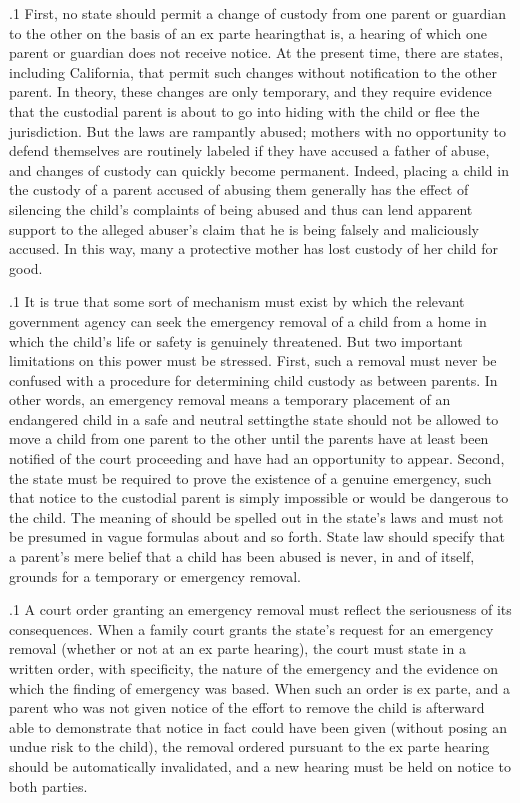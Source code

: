 \documentclass[11pt, twoside]{article}
\begin{document}
{\p.1{%
First, no state should permit a change of custody from one parent or
guardian to the other on the basis of an ex parte hearing\mdash{}that is, a hearing
of which one parent or guardian does not receive notice. At the present
time, there are states, including California, that permit such changes
without notification to the other parent. In theory, these changes are
only temporary, and they require evidence that the custodial parent
is about to go into hiding with the child or flee the jurisdiction. But
the laws are rampantly abused; mothers with no opportunity to defend
themselves are routinely labeled  if they have accused a father of abuse, and  changes of custody can quickly become
permanent. Indeed, placing a child in the custody of a parent accused
of abusing them generally has the effect of silencing the child’s complaints of being abused and thus can lend apparent support to the alleged
abuser’s claim that he is being falsely and maliciously accused. In this
way, many a protective mother has lost custody of her child for good.
}%

\p.1{%
It is true that some sort of mechanism must exist by which the relevant government agency can seek the emergency removal of a child from
a home in which the child’s life or safety is genuinely threatened. But
two important limitations on this power must be stressed. First, such
a removal must never be confused with a procedure for determining
child custody as between parents. In other words, an emergency removal
means a temporary placement of an endangered child in a safe and neutral setting\mdash{}the state should not be allowed to move a child from one
parent to the other until the parents have at least been notified of the
court proceeding and have had an opportunity to appear. Second, the
state must be required to prove the existence of a genuine emergency,
such that notice to the custodial parent is simply impossible or would be
dangerous to the child. The meaning of  should be spelled
out in the state’s laws and must not be presumed in vague formulas about
 and so forth. State law should specify that a parent’s mere belief that a child has been abused is never, in and of itself,
grounds for a temporary or emergency removal.
}%

\p.1{%
A court order granting an emergency removal must reflect the seriousness of its consequences. When a family court grants the state’s
request for an emergency removal (whether or not at an ex parte hearing), the court must state in a written order, with specificity, the nature
of the emergency and the evidence on which the finding of emergency
was based. When such an order is ex parte, and a parent who was not
given notice of the effort to remove the child is afterward able to demonstrate that notice in fact could have been given (without posing an undue
risk to the child), the removal ordered pursuant to the ex parte hearing
should be automatically invalidated, and a new hearing must be held on
notice to both parties.
}%

}
\end{document}

